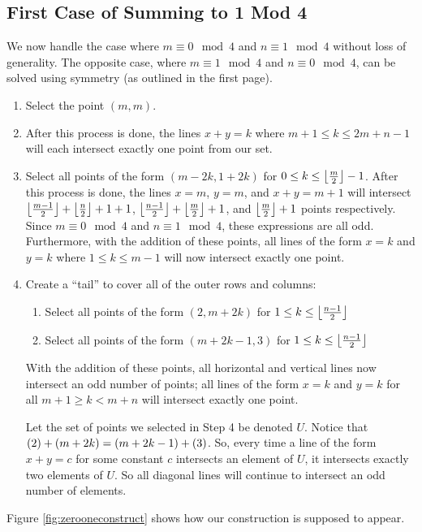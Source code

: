 \documentclass[10pt]{../usamts}
\begin{document}
\begin{solution}
\section*{First Case of Summing to 1 Mod 4}
We now handle the case where $m \equiv 0 \mod 4$ and $n \equiv 1 \mod 4$ without loss of generality. The opposite case, where $m \equiv 1 \mod 4$ and $n \equiv 0 \mod 4$, can be solved using symmetry (as outlined in the first page).

\begin{enumerate}
    \item Select the point $(m,m)$.
    \item \mainaxis
    After this process is done, the lines $x+y = k$ where $m+1 \leq k \leq 2m+n-1$ will each intersect exactly one point from our set.
    \item Select all points of the form $(m-2k, 1+2k)$ for $0 \leq k \leq \left\lfloor \frac{m}{2} \right\rfloor-1$.
    After this process is done, the lines $x=m$, $y=m$, and $x+y = m+1$ will intersect $\left\lfloor \frac{m-1}{2} \right\rfloor + \left\lfloor \frac{n}{2} \right\rfloor + 1 + 1$, $\left\lfloor \frac{n-1}{2} \right\rfloor + \left\lfloor \frac{m}{2} \right\rfloor + 1$, and $\left\lfloor \frac{m}{2} \right\rfloor + 1$ points respectively. Since $m \equiv 0 \mod 4$ and $n \equiv 1 \mod 4$, these expressions are all odd. Furthermore, with the addition of these points, all lines of the form $x=k$ and $y=k$ where $1 \leq k \leq m-1$ will now intersect exactly one point.
    \item Create a ``tail'' to cover all of the outer rows and columns:
    \begin{enumerate}
        \item Select all points of the form $(2, m+2k)$ for $1 \leq k \leq \left\lfloor \frac{n-1}{2} \right\rfloor$
        \item Select all points of the form $(m+2k-1, 3)$ for $1 \leq k \leq \left\lfloor \frac{n-1}{2} \right\rfloor$
    \end{enumerate}
    With the addition of these points, all horizontal and vertical lines now intersect an odd number of points; all lines of the form $x = k$ and $y=k$ for all $m+1 \geq k < m+n$ will intersect exactly one point.
    
    Let the set of points we selected in Step 4 be denoted $U$. Notice that $\left( 2 \right)+\left( m+2k \right) = \left( m+2k-1 \right)+\left( 3 \right)$. So, every time a line of the form $x+y=c$ for some constant $c$ intersects an element of $U$, it intersects exactly two elements of $U$. So all diagonal lines will continue to intersect an odd number of elements.
\end{enumerate}
Figure \ref{fig:zerooneconstruct} shows how our construction is supposed to appear.


\end{solution}
\end{document}
